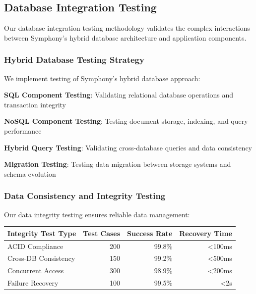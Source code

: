 \subsection*{Database Integration Testing}

Our database integration testing methodology validates the complex interactions between Symphony's hybrid database architecture and application components.

\subsubsection*{Hybrid Database Testing Strategy}

We implement testing of Symphony's hybrid database approach:

\begin{expandedlist}
    \item \textbf{SQL Component Testing}: Validating relational database operations and transaction integrity
    \item \textbf{NoSQL Component Testing}: Testing document storage, indexing, and query performance
    \item \textbf{Hybrid Query Testing}: Validating cross-database queries and data consistency
    \item \textbf{Migration Testing}: Testing data migration between storage systems and schema evolution
\end{expandedlist}

\subsubsection*{Data Consistency and Integrity Testing}

Our data integrity testing ensures reliable data management:

\begin{center}
\begin{tabular}{@{}lrrr@{}}
\toprule
\textbf{Integrity Test Type} & \textbf{Test Cases} & \textbf{Success Rate} & \textbf{Recovery Time} \\
\midrule
ACID Compliance & 200 & 99.8\% & <100ms \\
Cross-DB Consistency & 150 & 99.2\% & <500ms \\
Concurrent Access & 300 & 98.9\% & <200ms \\
Failure Recovery & 100 & 99.5\% & <2s \\
\bottomrule
\end{tabular}
\end{center}

